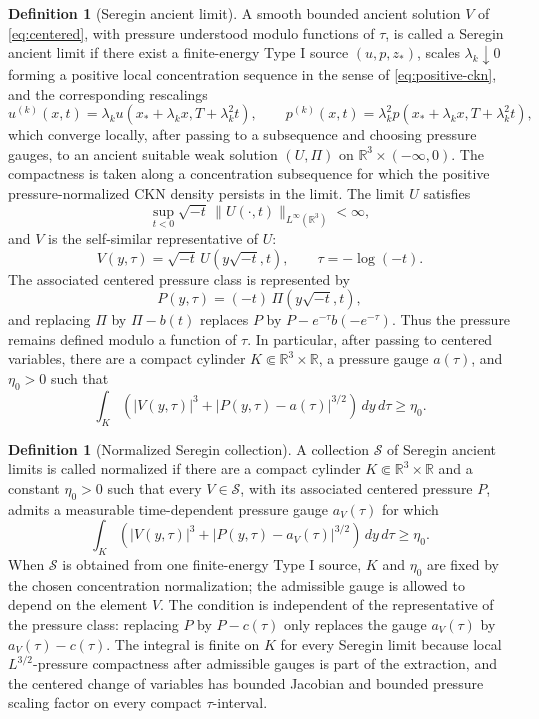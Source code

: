 \documentclass[11pt]{amsart}
\theoremstyle{plain}
\theoremstyle{definition}
\newtheorem{definition}[theorem]{Definition}
\theoremstyle{remark}
\numberwithin{equation}{section}
\begin{document}
\begin{definition}[Seregin ancient limit]\label{def:seregin-limit}
A smooth bounded ancient solution \(V\) of \eqref{eq:centered}, with pressure
understood modulo functions of \(\tau\), is called a Seregin ancient limit if
there exist a finite-energy Type I source \((u,p,z_*)\), scales
\(\lambda_k\downarrow0\) forming a positive local concentration sequence in
the sense of \eqref{eq:positive-ckn}, and the corresponding rescalings
\[
   u^{(k)}(x,t)=\lambda_k u(x_*+\lambda_k x,T+\lambda_k^2t),
   \qquad
   p^{(k)}(x,t)=\lambda_k^2 p(x_*+\lambda_k x,T+\lambda_k^2t),
\]
which converge locally, after passing to a subsequence and choosing pressure
gauges, to an ancient suitable weak solution \((U,\Pi)\) on
\(\mathbb R^3\times(-\infty,0)\).  The compactness is taken along a
concentration subsequence for which the positive pressure-normalized CKN
density persists in the limit.  The limit \(U\) satisfies
\[
   \sup_{t<0}\sqrt{-t}\,\|U(\cdot,t)\|_{L^\infty(\mathbb R^3)}<\infty ,
\]
and \(V\) is the self-similar representative of \(U\):
\[
   V(y,\tau)=\sqrt{-t}\,U(y\sqrt{-t},t),\qquad \tau=-\log(-t).
\]
The associated centered pressure class is represented by
\[
   P(y,\tau)=(-t)\,\Pi(y\sqrt{-t},t),
\]
and replacing \(\Pi\) by \(\Pi-b(t)\) replaces \(P\) by
\(P-e^{-\tau}b(-e^{-\tau})\).  Thus the pressure remains defined modulo a
function of \(\tau\).
In particular, after passing to centered variables, there are a compact
cylinder \(K\Subset\mathbb R^3\times\mathbb R\), a pressure gauge \(a(\tau)\),
and \(\eta_0>0\) such that
\begin{equation}\label{eq:nonvanishing}
   \int_K\left(|V(y,\tau)|^3+|P(y,\tau)-a(\tau)|^{3/2}\right)\,dy\,d\tau
   \ge\eta_0 .
\end{equation}
\end{definition}

\begin{definition}[Normalized Seregin collection]\label{def:normalized-collection}
A collection \(\mathcal S\) of Seregin ancient limits is called normalized if
there are a compact cylinder \(K\Subset\mathbb R^3\times\mathbb R\) and a
constant \(\eta_0>0\) such that every \(V\in\mathcal S\), with its associated
centered pressure \(P\), admits a measurable time-dependent pressure gauge
\(a_V(\tau)\) for which
\begin{equation}\label{eq:collection-nonvanishing}
   \int_K\left(|V(y,\tau)|^3+|P(y,\tau)-a_V(\tau)|^{3/2}\right)\,dy\,d\tau
   \ge\eta_0 .
\end{equation}
When \(\mathcal S\) is obtained from one finite-energy Type I source, \(K\) and
\(\eta_0\) are fixed by the chosen concentration normalization; the admissible
gauge is allowed to depend on the element \(V\).
The condition is independent of the representative of the pressure class:
replacing \(P\) by \(P-c(\tau)\) only replaces the gauge \(a_V(\tau)\) by
\(a_V(\tau)-c(\tau)\).
The integral is finite on \(K\) for every Seregin limit because local
\(L^{3/2}\)-pressure compactness after admissible gauges is part of the
extraction, and the centered change of variables has bounded Jacobian and
bounded pressure scaling factor on every compact \(\tau\)-interval.
\end{definition}
\end{document}
